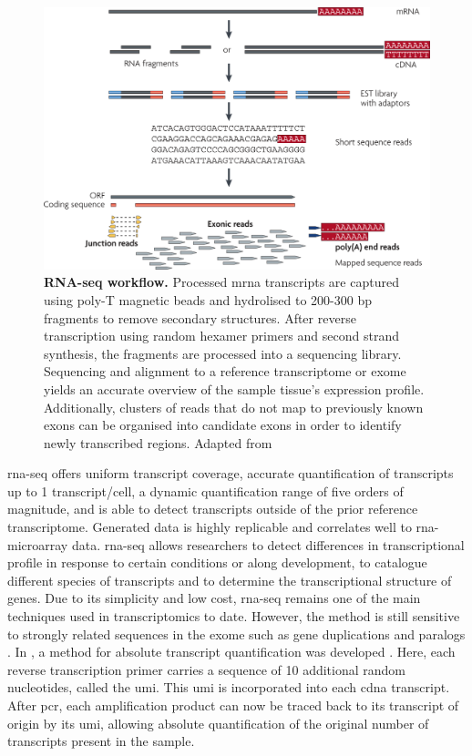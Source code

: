 \begin{figure}[ht]
	\centerfloat
	\includegraphics[width=\textwidth]{./ims/wang2009.png}
	\caption[RNA-seq workflow]{\textbf{RNA-seq workflow.} Processed \acrshort{mrna} transcripts are captured using poly-T magnetic beads and hydrolised to 200-300 \acrshort{bp} fragments to remove secondary structures. After reverse transcription using random hexamer primers and second strand synthesis, the fragments are processed into a sequencing library. Sequencing and alignment to a reference transcriptome or exome yields an accurate overview of the sample tissue's expression profile. Additionally, clusters of reads that do not map to previously known exons can be organised into candidate exons in order to identify newly transcribed regions. Adapted from \citealt{wang2009}}
	\label{fig:wang2009}
\end{figure}

\acrshort{rna-seq} offers uniform transcript coverage, accurate quantification of transcripts up to 1 transcript/cell, a dynamic quantification range of five orders of magnitude, and is able to detect transcripts outside of the prior reference transcriptome. Generated data is highly replicable and correlates well to \acrshort{rna}-microarray data. \acrshort{rna-seq} allows researchers to detect differences in transcriptional profile in response to certain conditions or along development, to catalogue different species of transcripts and to determine the transcriptional structure of genes. Due to its simplicity and low cost, \acrshort{rna-seq} remains one of the main techniques used in transcriptomics to date. However, the method is still sensitive to strongly related sequences in the exome such as gene duplications and paralogs \citep{wang2009}. In \citeyear{kivioja2012}, a method for absolute transcript quantification was developed \citep{kivioja2012}. Here, each reverse transcription primer carries a sequence of 10 additional random nucleotides, called the \acrfull{umi}. This \acrshort{umi} is incorporated into each \acrshort{cdna} transcript. After \acrshort{pcr}, each amplification product can now be traced back to its transcript of origin by its \acrshort{umi}, allowing absolute quantification of the original number of transcripts present in the sample.\pms

